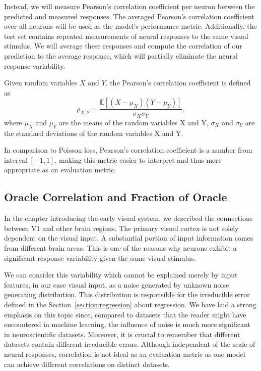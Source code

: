 Instead, we will measure Pearson’s correlation coefficient per neuron between the predicted and measured responses. The averaged Pearson’s correlation coefficient over all neurons will be used as the model’s performance metric. Additionally, the test set contains repeated measurements of neural responses to the same visual stimulus. We will average these responses and compute the correlation of our prediction to the average response, which will partially eliminate the neural response variability.

\begin{defn}\label{def01:9}
	Given random variables $X$ and $Y$, the Pearson's correlation coefficient is defined as
	\begin{equation}
		\rho_{X, Y} = \frac{\mathbb{E}\left[(X - \mu_X)(Y - \mu_Y)\right]}{\sigma_X \sigma_Y},
	\end{equation}
	where $\mu_X$ and $\mu_Y$ are the means of the random variables X and Y, $\sigma_X$ and $\sigma_Y$ are the standard deviations of the random variables X and Y.
\end{defn}


In comparison to Poisson loss, Pearson’s correlation coefficient is a number from interval $[-1, 1]$, making this metric easier to interpret and thus more appropriate as an evaluation metric.

\subsection{Oracle Correlation and Fraction of Oracle}

In the chapter introducing the early visual system, we described the connections between V1 and other brain regions. The primary visual cortex is not solely dependent on the visual input. A substantial portion of input information comes from different brain areas. This is one of the reasons why neurons exhibit a significant response variability given the same visual stimulus.

We can consider this variability which cannot be explained merely by input features, in our case visual input, as a noise generated by unknown noise generating distribution. This distribution is responsible for the irreducible error defined in the Section~\ref{section:regression} about regression. We have laid a strong emphasis on this topic since, compared to datasets that the reader might have encountered in machine learning, the influence of noise is much more significant in neuroscientific datasets. Moreover, it is crucial to remember that different datasets contain different irreducible errors. Although independent of the scale of neural responses, correlation is not ideal as an evaluation metric as one model can achieve different correlations on distinct datasets.

